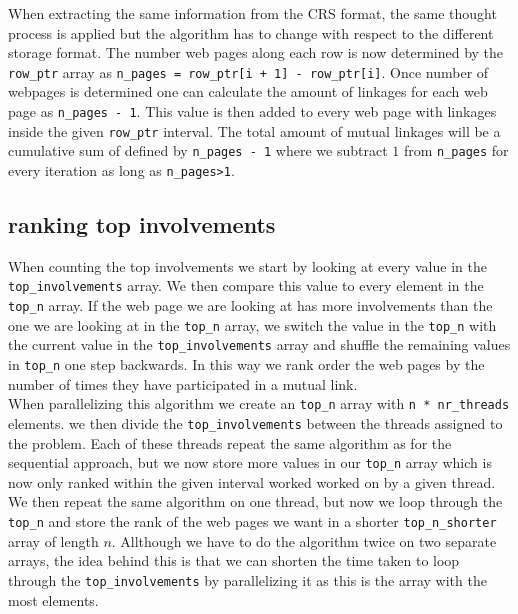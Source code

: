 \documentclass[onecolumn]{aastex62}
\begin{document}
When extracting the same information from the CRS format, the same thought process is applied but the algorithm has to change with respect to the different storage format. The number web pages along each row is now determined by the \texttt{row\_ptr} array as \texttt{n\_pages = row\_ptr[i + 1] - row\_ptr[i]}. Once number of webpages is determined one can calculate the amount of linkages for each web page as \texttt{n\_pages - 1}. This value is then added to every web page with linkages inside the given \texttt{row\_ptr} interval. The total amount of mutual linkages will be a cumulative sum of defined by \texttt{n\_pages - 1} where we subtract $1$ from \texttt{n\_pages} for every iteration as long as \texttt{n\_pages>1}.
\subsection{ranking top involvements}
When counting the top involvements we start by looking at every value in the \texttt{top\_involvements} array. We then compare this value to every element in the \texttt{top\_n} array. If the web page we are looking at has more involvements than the one we are looking at in the \texttt{top\_n} array, we switch the value in the \texttt{top\_n} with the current value in the \texttt{top\_involvements} array and shuffle the remaining values in \texttt{top\_n} one step backwards. In this way we rank order the web pages by the number of times they have participated in a mutual link.\\

When parallelizing this algorithm we create an \texttt{top\_n} array with \texttt{n * nr\_threads} elements. we then divide the \texttt{top\_involvements} between the threads assigned to the problem. Each of these threads repeat the same algorithm as for the sequential approach, but we now store more values in our \texttt{top\_n} array which is now only ranked within the given interval worked worked on by a given thread. We then repeat the same algorithm on one thread, but now we loop through the \texttt{top\_n} and store the rank of the web pages we want in a shorter \texttt{top\_n\_shorter} array of length $n$. Allthough we have to do the algorithm twice on two separate arrays, the idea behind this is that we can shorten the time taken to loop through the \texttt{top\_involvements} by parallelizing it as this is the array with the most elements.
\end{document}
